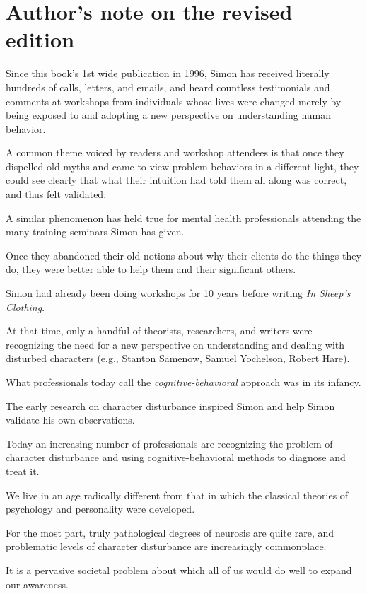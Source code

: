 \documentclass[oneside]{book}
\numberwithin{equation}{section}
\begin{document}
\section*{Author's note on the revised edition}
Since this book's 1st wide publication in 1996, Simon has received literally hundreds of calls, letters, and emails, and heard countless testimonials and comments at workshops from individuals whose lives were changed merely by being exposed to and adopting a new perspective on understanding human behavior.

A common theme voiced by readers and workshop attendees is that once they dispelled old myths and came to view problem behaviors in a different light, they could see clearly that what their intuition had told them all along was correct, and thus felt validated.

A similar phenomenon has held true for mental health professionals attending the many training seminars Simon has given.

Once they abandoned their old notions about why their clients do the things they do, they were better able to help them and their significant others.

Simon had already been doing workshops for 10 years before writing \textit{In Sheep's Clothing}.

At that time, only a handful of theorists, researchers, and writers were recognizing the need for a new perspective on understanding and dealing with disturbed characters (e.g., Stanton Samenow, Samuel Yochelson, Robert Hare).

What professionals today call the \textit{cognitive-behavioral} approach was in its infancy.

The early research on character disturbance inspired Simon and help Simon validate his own observations.

Today an increasing number of professionals are recognizing the problem of character disturbance and using cognitive-behavioral methods to diagnose and treat it.

%
We live in an age radically different from that in which the classical theories of psychology and personality were developed.

For the most part, truly pathological degrees of neurosis are quite rare, and problematic levels of character disturbance are increasingly commonplace.

It is a pervasive societal problem about which all of us would do well to expand our awareness.
\end{document}
